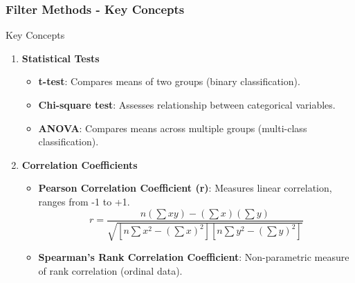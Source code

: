 \documentclass[aspectratio=169]{beamer}
\begin{document}
\begin{frame}[fragile]
    \frametitle{Filter Methods - Key Concepts}
    \begin{block}{Key Concepts}
        \begin{enumerate}
            \item \textbf{Statistical Tests}
            \begin{itemize}
                \item \textbf{t-test}: Compares means of two groups (binary classification).
                \item \textbf{Chi-square test}: Assesses relationship between categorical variables.
                \item \textbf{ANOVA}: Compares means across multiple groups (multi-class classification).
            \end{itemize}
    
            \item \textbf{Correlation Coefficients}
            \begin{itemize}
                \item \textbf{Pearson Correlation Coefficient (r)}: Measures linear correlation, ranges from -1 to +1.
                \begin{equation}
                    r = \frac{n(\sum xy) - (\sum x)(\sum y)}{\sqrt{[n\sum x^2 - (\sum x)^2][n\sum y^2 - (\sum y)^2]}}
                \end{equation}
                \item \textbf{Spearman's Rank Correlation Coefficient}: Non-parametric measure of rank correlation (ordinal data).
            \end{itemize}
        \end{enumerate}
    \end{block}
\end{frame}
\end{document}
